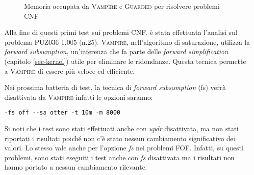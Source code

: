 \begin{figure}[H]
    \caption{Memoria occupata da \textsc{Vampire} e \textsc{Guarded} per risolvere problemi CNF}
\end{figure}

Alla fine di questi primi test sui problemi CNF, è stata effettuata l'analisi sul problema PUZ036-1.005 (n.25).
\textsc{Vampire}, nell'algoritmo di saturazione, utilizza la \emph{forward subsumption},
un'inferenza che fa parte delle \emph{forward simplification} (capitolo \ref{sec-kernel}) utile per eliminare le ridondanze.
Questa tecnica permette a \textsc{Vampire} di essere più veloce ed efficiente.

Nei prossima batteria di test, la tecnica di \emph{forward subsumption} (fs) verrà disattivata da \textsc{Vampire} 
infatti le opzioni saranno:
\begin{center}
    \verb|-fs off --sa otter -t 10m -m 8000|    
\end{center}
Si noti che i test sono stati effettuati anche con \emph{updr} disattivata, ma
non stati riportati i risultati poiché non c'è stato nessun cambiamento significativo dei valori. Lo stesso 
vale anche per l'opzione \emph{fs} nei problemi FOF. Infatti, su questi problemi, sono stati 
eseguiti i test anche con \emph{fs} disattivata ma i risultati non hanno portato a nessun cambiamento rilevante.


